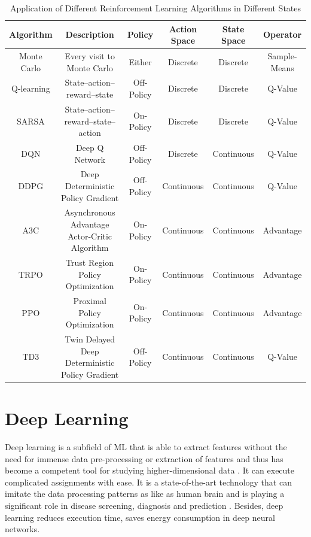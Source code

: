 \documentclass[conference]{IEEEtran}
\begin{document}
\begin{table}[t]
\caption{Application of Different Reinforcement Learning Algorithms in Different States\cite{b8}}
\begin{center}
\def\arraystretch{1.5}%
\begin{tabular}{|c|c|c|c|c|c|}
\hline
\textbf{Algorithm}&\textbf{Description}&\textbf{Policy}&\textbf{Action Space}&\textbf{State Space}&\textbf{Operator} \\
\hline
Monte Carlo & Every visit to Monte Carlo & Either & Discrete & Discrete & Sample-Means \\
\hline
Q-learning & State–action–reward–state & Off-Policy & Discrete & Discrete & Q-Value \\
\hline
SARSA & State–action–reward–state–action & On-Policy & Discrete & Discrete & Q-Value \\
\hline
DQN & Deep Q Network & Off-Policy & Discrete & Continuous & Q-Value \\
\hline
DDPG & Deep Deterministic Policy Gradient & Off-Policy & Continuous & Continuous & Q-Value \\
\hline
A3C & Asynchronous Advantage Actor-Critic Algorithm & On-Policy & Continuous & Continuous & Advantage \\
\hline
TRPO & Trust Region Policy Optimization & On-Policy & Continuous & Continuous & Advantage \\
\hline
PPO & Proximal Policy Optimization & On-Policy & Continuous & Continuous & Advantage \\
\hline
TD3 & Twin Delayed Deep Deterministic Policy Gradient & Off-Policy & Continuous & Continuous & Q-Value \\
\hline
\end{tabular}
\label{tab1}
\end{center}
\end{table}

\section{Deep Learning}
Deep learning is a subfield of ML that is able to extract features without the need for immense data pre-processing or extraction of features and thus has become a competent tool for studying higher-dimensional data \cite{b7}. It can execute complicated assignments with ease. It is a state-of-the-art technology that can imitate the data processing patterns as like as human brain and is playing a significant role in disease screening, diagnosis and prediction \cite{b7}. Besides, deep learning reduces execution time, saves energy consumption in deep neural networks.
\end{document}
